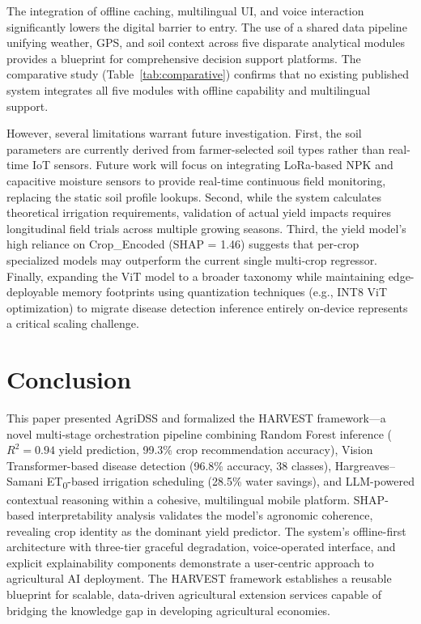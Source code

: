 \documentclass[conference]{IEEEtran}
\begin{document}
The integration of offline caching, multilingual UI, and voice interaction significantly lowers the digital barrier to entry. The use of a shared data pipeline unifying weather, GPS, and soil context across five disparate analytical modules provides a blueprint for comprehensive decision support platforms. The comparative study (Table~\ref{tab:comparative}) confirms that no existing published system integrates all five modules with offline capability and multilingual support.

However, several limitations warrant future investigation. First, the soil parameters are currently derived from farmer-selected soil types rather than real-time IoT sensors. Future work will focus on integrating LoRa-based NPK and capacitive moisture sensors to provide real-time continuous field monitoring, replacing the static soil profile lookups. Second, while the system calculates theoretical irrigation requirements, validation of actual yield impacts requires longitudinal field trials across multiple growing seasons. Third, the yield model's high reliance on Crop\_Encoded (SHAP = 1.46) suggests that per-crop specialized models may outperform the current single multi-crop regressor. Finally, expanding the ViT model to a broader taxonomy while maintaining edge-deployable memory footprints using quantization techniques (e.g., INT8 ViT optimization) to migrate disease detection inference entirely on-device represents a critical scaling challenge.

\section{Conclusion}

This paper presented AgriDSS and formalized the HARVEST framework---a novel multi-stage orchestration pipeline combining Random Forest inference ($R^2 = 0.94$ yield prediction, 99.3\% crop recommendation accuracy), Vision Transformer-based disease detection (96.8\% accuracy, 38 classes), Hargreaves--Samani ET\textsubscript{0}-based irrigation scheduling (28.5\% water savings), and LLM-powered contextual reasoning within a cohesive, multilingual mobile platform. SHAP-based interpretability analysis validates the model's agronomic coherence, revealing crop identity as the dominant yield predictor. The system's offline-first architecture with three-tier graceful degradation, voice-operated interface, and explicit explainability components demonstrate a user-centric approach to agricultural AI deployment. The HARVEST framework establishes a reusable blueprint for scalable, data-driven agricultural extension services capable of bridging the knowledge gap in developing agricultural economies.



\end{document}
